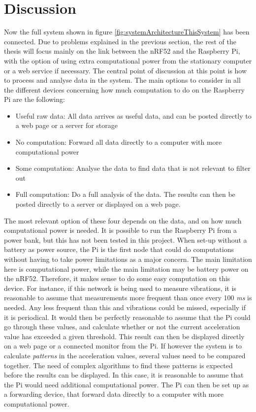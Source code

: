 
\section{Discussion}

\noindent Now the full system shown in figure \ref{fig:systemArchitectureThisSystem} has been connected. Due to problems explained in the previous section, the rest of the thesis will focus mainly on the link between the \gls{nRF52} and the \gls{Raspberry Pi}, with the option of using extra computational power from the stationary computer or a web service if necessary. The central point of discussion at this point is how to process and analyse data in the system. The main options to consider in all the different devices concerning how much computation to do on the \gls{Raspberry Pi} are the following: 

\begin{itemize}
  \item Useful raw data: All data arrives as useful data, and can be posted directly to a web page or a server for storage
  \item No computation: Forward all data directly to a computer with more computational power
  \item Some computation: Analyse the data to find data that is not relevant to filter out
  \item Full computation: Do a full analysis of the data. The results can then be posted directly to a server or displayed on a web page. 
\end{itemize}

\noindent The most relevant option of these four depends on the data, and on how much computational power is needed. It is possible to run the \gls{Raspberry Pi} from a power bank, but this has not been tested in this project. When set-up without a battery as power source, the Pi is the first node that could do computations without having to take power limitations as a major concern. The main limitation here is computational power, while the main limitation may be battery power on the \gls{nRF52}. Therefore, it makes sense to do some easy computation on this device. For instance, if this network is being used to measure vibrations, it is reasonable to assume that measurements more frequent than once every 100 \textit{ms} is needed. Any less frequent than this and vibrations could be missed, especially if it is periodical. It would then be perfectly reasonable to assume that the Pi could go through these values, and calculate whether or not the current acceleration value has exceeded a given threshold. This result can then be displayed directly on a web page or a connected monitor from the Pi. If however the system is to calculate \textit{patterns} in the acceleration values, several values need to be compared together. The need of complex algorithms to find these patterns is expected before the results can be displayed. In this case, it is reasonable to assume that the Pi would need additional computational power. The Pi can then be set up as a forwarding device, that forward data directly to a computer with more computational power. 




